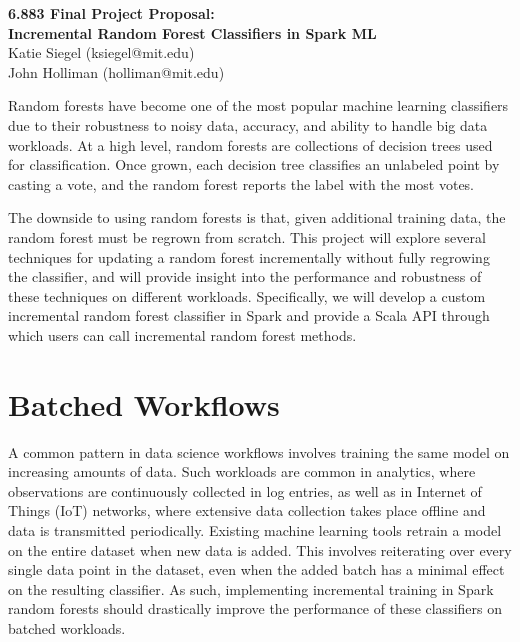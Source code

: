 \documentclass{article}
\begin{document}
\begin{center}
{\Large\bf 6.883 Final Project Proposal:} \\[1ex]
{\Large\bf Incremental Random Forest Classifiers in Spark ML} \\[1ex]
{\large Katie Siegel (ksiegel@mit.edu) \\ \large John Holliman (holliman@mit.edu)}
\end{center}

\vspace{-12pt}
\noindent\makebox[\linewidth]{\rule{\textwidth}{1pt}}
\vspace{3pt}

\noindent
Random forests have become one of the most popular machine learning classifiers
due to their robustness to noisy data, accuracy, and ability to handle big data
workloads. At a high level, random forests are collections of decision trees
used for classification. Once grown, each decision tree classifies an unlabeled
point by casting a vote, and the random forest reports the label with the most
votes. 

The downside to using random forests is that, given additional training data,
the random forest must be regrown from scratch. This project will explore several
techniques for updating a random forest incrementally without fully regrowing
the classifier, and will  provide insight into the performance and robustness
of these techniques on different workloads. Specifically, we will develop a
custom incremental random forest classifier in Spark and provide a Scala API
through which users can call incremental random forest methods.

\section{Batched Workflows}

A common pattern in data science workflows involves training the same model on
increasing amounts of data. Such workloads are common in analytics, where
observations are continuously collected in log entries, as well as in Internet
of Things (IoT) networks, where extensive data collection takes place offline
and data is transmitted periodically. Existing machine learning tools retrain a
model on the entire dataset when new data is added. This involves reiterating
over every single data point in the dataset, even when the added batch has a
minimal effect on the resulting classifier. As such, implementing incremental
training in Spark random forests should drastically improve the performance of
these classifiers on batched workloads.
\end{document}
